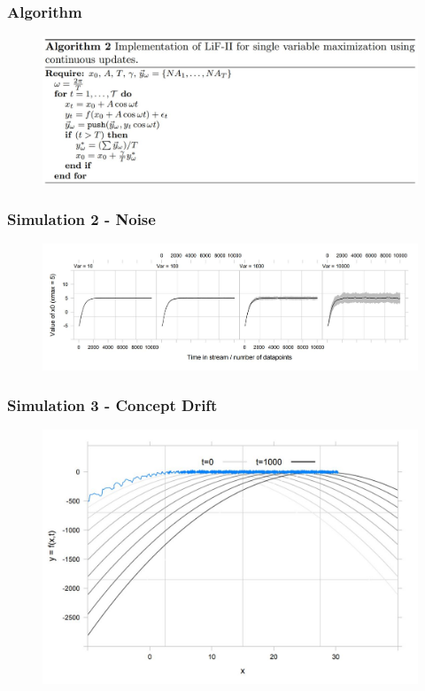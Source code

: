 \documentclass{beamer}
\begin{document}
\begin{frame}
    \frametitle{Algorithm}
    
    \begin{figure}
            \centering
            \includegraphics[width=\textwidth]{images/algorithm}
            \label{fig:alg}
        \end{figure}
\end{frame}

\begin{frame}
    \frametitle{Simulation 2 - Noise}
     
    \begin{figure}
            \centering
            \includegraphics[width=\textwidth]{images/sim_2}
            \label{fig:alg}
        \end{figure}
\end{frame}

\begin{frame}
    \frametitle{Simulation 3 - Concept Drift} 
    \begin{figure}
            \centering
            \includegraphics[width=\textwidth]{images/sim_3}
            \label{fig:alg}
        \end{figure}
\end{frame}
\end{document}
